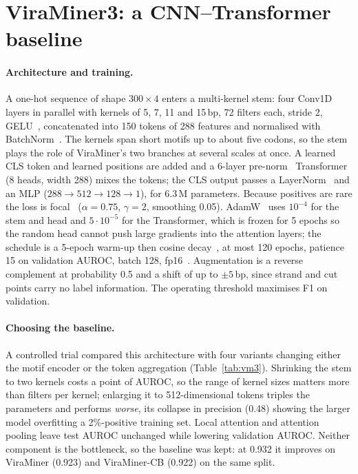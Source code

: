 \documentclass[10pt,twocolumn,a4paper]{article}
\begin{document}
\section{ViraMiner3: a CNN--Transformer baseline}\label{sec:vm3}

\paragraph{Architecture and training.}
A one-hot sequence of shape $300\times4$ enters a multi-kernel stem: four Conv1D
layers in parallel with kernels of 5, 7, 11 and 15\,bp, 72 filters each, stride
2, GELU~\cite{hendrycks2016gelu}, concatenated into 150 tokens of 288 features
and normalised with BatchNorm~\cite{ioffe2015batchnorm}. The kernels span short
motifs up to about five codons, so the stem plays the role of ViraMiner's two
branches at several scales at once. A learned CLS token and learned positions are
added and a 6-layer pre-norm~\cite{xiong2020prenorm} Transformer (8 heads, width
288) mixes the tokens; the CLS output passes a LayerNorm~\cite{ba2016layernorm}
and an MLP ($288\to512\to128\to1$), for 6.3\,M parameters. Because positives are
rare the loss is focal~\cite{lin2017focal} ($\alpha=0.75$, $\gamma=2$, smoothing
0.05). AdamW~\cite{loshchilov2019adamw} uses $10^{-4}$ for the stem and head and
$5\cdot10^{-5}$ for the Transformer, which is frozen for 5 epochs so the random
head cannot push large gradients into the attention layers; the schedule is a
5-epoch warm-up then cosine decay~\cite{loshchilov2017sgdr}, at most 120 epochs,
patience 15 on validation AUROC, batch 128, fp16~\cite{micikevicius2018mixed}.
Augmentation is a reverse complement at probability 0.5 and a shift of up to
$\pm5$\,bp, since strand and cut points carry no label information. The operating
threshold maximises F1 on validation.

\paragraph{Choosing the baseline.}
A controlled trial compared this architecture with four variants changing either
the motif encoder or the token aggregation (Table~\ref{tab:vm3}). Shrinking the
stem to two kernels costs a point of AUROC, so the range of kernel sizes matters
more than filters per kernel; enlarging it to 512-dimensional tokens triples the
parameters and performs \emph{worse}, its collapse in precision (0.48) showing
the larger model overfitting a 2\%-positive training set. Local attention and
attention pooling leave test AUROC unchanged while lowering validation AUROC.
Neither component is the bottleneck, so the baseline was kept: at 0.932 it
improves on ViraMiner (0.923) and ViraMiner-CB (0.922) on the same split.
\end{document}
